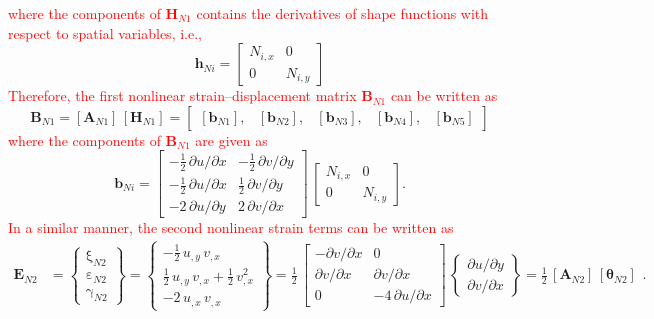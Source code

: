 \textcolor{red}{where the components of $\mathbf{H}_{N1}$ contains the derivatives of shape functions with respect to spatial variables, i.e.,}
\begin{equation}
\mathbf{h}_{Ni} = \begin{bmatrix}
N_{i,x} &  0  \\
0 & N_{i,y}  \end{bmatrix} 
\end{equation}
\textcolor{red}{Therefore, the first nonlinear strain--displacement matrix $\mathbf{B}_{N1}$ can be written as}
\begin{equation}
\mathbf{B}_{N1} = [\mathbf{A}_{N1}] \, [\mathbf{H}_{N1}] = \begin{bmatrix}
[\mathbf{b}_{N1}], & [\mathbf{b}_{N2}], & [\mathbf{b}_{N3}], & [\mathbf{b}_{N4}], & [\mathbf{b}_{N5}] 
\end{bmatrix} 
\end{equation}
\textcolor{red}{where the components of $\mathbf{B}_{N1}$ are given as}
\begin{equation}
\mathbf{b}_{Ni} = \begin{bmatrix}
-\tfrac{1}{2} \, \partial u / \partial x &  - \tfrac{1}{2} \, \partial v / \partial y \\
-\tfrac{1}{2} \, \partial u / \partial x &  \tfrac{1}{2} \, \partial v / \partial y \\
-2 \, \partial u / \partial y  & 2 \, \partial v / \partial x  \end{bmatrix}  \, \begin{bmatrix}
N_{i,x} &  0  \\
0 & N_{i,y}  \end{bmatrix}. 
\end{equation}
\textcolor{red}{In a similar manner, the second nonlinear strain terms can be written as} 
\begin{equation}
\begin{aligned}
\mathbf{E}_{N2} & =  \begin{Bmatrix}
\mathrm \xi_{N2} \\
\mathrm \varepsilon_{N2} \\
\mathrm \gamma_{N2} \end{Bmatrix} =
\begin{Bmatrix}
-\tfrac{1}{2} \, u_{,y} \, v_{,x}  \\
\tfrac{1}{2} \, u_{,y} \, v_{,x}  + \tfrac{1}{2} \, v_{,x}^2 \\
-2 \, u_{,x} \, v_{,x} \end{Bmatrix} = \frac{1}{2} \, \begin{bmatrix}
- \partial v / \partial x &  0 \\
\partial v / \partial x &  \partial v / \partial x \\
0 & -4 \, \partial u / \partial x  \end{bmatrix} \, \begin{Bmatrix}
\partial u / \partial y\\
\partial v / \partial x
\end{Bmatrix}
= \tfrac{1}{2} \, [\mathbf{A}_{N2}] \, [\boldsymbol{\theta}_{N2}]
\end{aligned}.
\end{equation}
